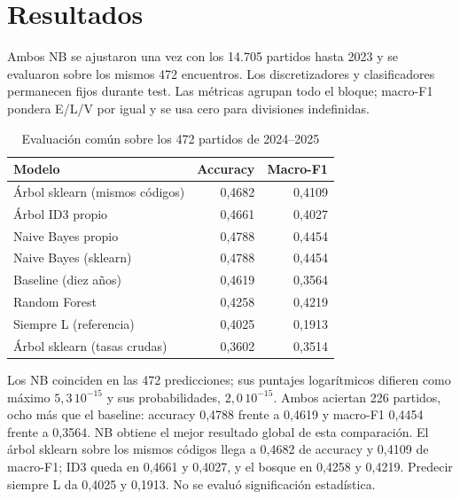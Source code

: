 \documentclass[conference]{IEEEtran}
\begin{document}
\section{Resultados}
\label{sec:resultados}

Ambos NB se ajustaron una vez con los 14.705 partidos hasta 2023 y se evaluaron sobre los mismos 472 encuentros. Los discretizadores y clasificadores permanecen fijos durante test. Las métricas agrupan todo el bloque; macro-F1 pondera E/L/V por igual y se usa cero para divisiones indefinidas.

\begin{table}[htbp]
\caption{Evaluación común sobre los 472 partidos de 2024--2025}
\label{tab:resultados}
\centering
\begin{tabular}{lrr}
\hline
Modelo & Accuracy & Macro-F1 \\
\hline
Árbol sklearn (mismos códigos) & 0,4682 & 0,4109 \\
Árbol ID3 propio & 0,4661 & 0,4027 \\
Naive Bayes propio & 0,4788 & 0,4454 \\
Naive Bayes (sklearn) & 0,4788 & 0,4454 \\
Baseline (diez años) & 0,4619 & 0,3564 \\
Random Forest & 0,4258 & 0,4219 \\
Siempre L (referencia) & 0,4025 & 0,1913 \\
Árbol sklearn (tasas crudas) & 0,3602 & 0,3514 \\
\hline
\end{tabular}
\end{table}

Los NB coinciden en las 472 predicciones; sus puntajes logarítmicos difieren como máximo $5{,}3\,10^{-15}$ y sus probabilidades, $2{,}0\,10^{-15}$. Ambos aciertan 226 partidos, ocho más que el baseline: accuracy 0,4788 frente a 0,4619 y macro-F1 0,4454 frente a 0,3564. NB obtiene el mejor resultado global de esta comparación. El árbol sklearn sobre los mismos códigos llega a 0,4682 de accuracy y 0,4109 de macro-F1; ID3 queda en 0,4661 y 0,4027, y el bosque en 0,4258 y 0,4219. Predecir siempre L da 0,4025 y 0,1913. No se evaluó significación estadística.
\end{document}
